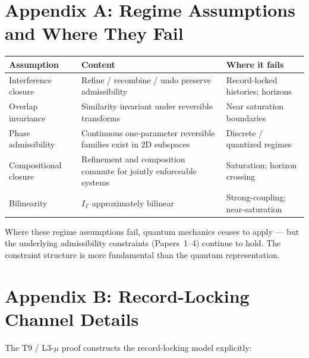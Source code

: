 \documentclass[11pt]{article}
\begin{document}
\section*{Appendix A: Regime Assumptions and Where They Fail}

\begin{center}
\begin{tabular}{@{}lll@{}}
\toprule
Assumption & Content & Where it fails \\
\midrule
Interference closure & Refine / recombine / undo preserve admissibility & Record-locked histories; horizons \\
Overlap invariance & Similarity invariant under reversible transforms & Near saturation boundaries \\
Phase admissibility & Continuous one-parameter reversible families exist in 2D subspaces & Discrete / quantized regimes \\
Compositional closure & Refinement and composition commute for jointly enforceable systems & Saturation; horizon crossing \\
Bilinearity & $I_{\Gamma}$ approximately bilinear & Strong-coupling; near-saturation \\
\bottomrule
\end{tabular}
\end{center}
Where these regime assumptions fail, quantum mechanics ceases to apply --- but the
underlying admissibility constraints (Papers~1--4) continue to hold. The
constraint structure is more fundamental than the quantum representation.

\section*{Appendix B: Record-Locking Channel Details}

The T9 / L3-$\mu$ proof constructs the record-locking model explicitly:
\end{document}
